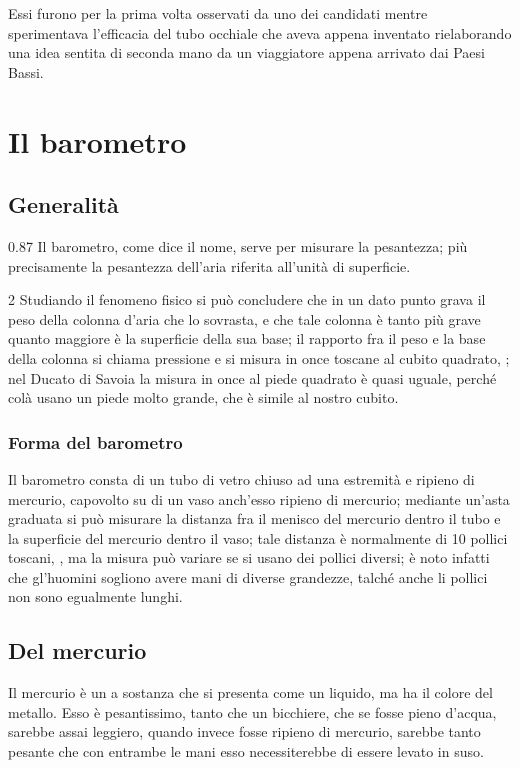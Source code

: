 \documentclass[%
,corpo=11pt
,twoside
,greek%
,cucitura
]{toptesi}
\begin{document}
Essi furono per la prima volta osservati da uno dei candidati mentre
sperimentava l'efficacia del tubo occhiale che aveva appena inventato
rielaborando una idea sentita di seconda mano da un viaggiatore appena arrivato
dai Paesi Bassi.





\chapter{Il barometro}
\section{Generalit\`a}
\begin{interlinea}{0.87} Il barometro, come dice il nome, serve per
misurare la pesantezza; pi\`u precisamente la pesantezza dell'aria
riferita all'unit\`a di superficie.
\end{interlinea}

\begin{interlinea}{2} Studiando il fenomeno fisico si pu\`o concludere
che in un dato punto grava il peso della colonna d'aria che lo
sovrasta, e che tale colonna \`e tanto pi\`u grave quanto maggiore
\`e la superficie della sua base; il rapporto fra il peso e la base
della colonna si chiama pressione e si misura in once toscane al cubito
quadrato, \cite{tor1}; nel Ducato di Savoia la misura in once al piede
quadrato \`e quasi uguale, perch\'e col\`a usano un piede molto
grande, che \`e simile al nostro cubito.
\end{interlinea}

\subsection{Forma del barometro}
Il barometro consta di un tubo di vetro chiuso ad una estremit\`a e
ripieno di mercurio, capovolto su di un vaso anch'esso ripieno di
mercurio; mediante un'asta graduata si pu\`o misurare la distanza fra
il menisco del mercurio dentro il tubo e la superficie del mercurio
dentro il vaso; tale distanza \`e normalmente di 10 pollici toscani,
\cite{tor1,tor2}, ma la misura pu\`o variare se si usano dei pollici
diversi; \`e noto infatti che gl'huomini sogliono avere mani di
diverse grandezze, talch\'e anche li pollici non sono egualmente
lunghi.
\section{Del mercurio}
Il mercurio \`e un a sostanza che si presenta come un liquido, ma ha il colore
del metallo. Esso \`e pesantissimo, tanto che un bicchiere, che se fosse pieno
d'acqua, sarebbe assai leggiero, quando invece fosse ripieno di mercurio,
sarebbe tanto pesante che con entrambe le mani esso necessiterebbe di essere
levato in suso.
\end{document}
